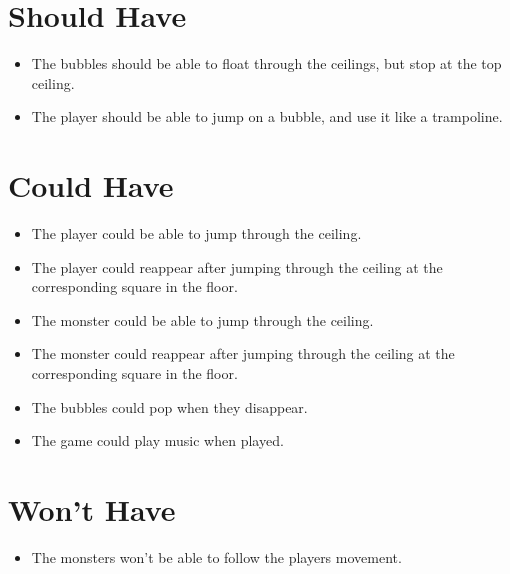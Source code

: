 \section{Should Have}
\begin{itemize}
\itemsep0em
\item The bubbles should be able to float through the ceilings, but stop at the top ceiling.
\item The player should be able to jump on a bubble, and use it like a trampoline.
\end{itemize}

\section{Could Have}
\begin{itemize}
\itemsep0em
\item The player could be able to jump through the ceiling.
\item The player could reappear after jumping through the ceiling at the corresponding square in the floor.
\item The monster could be able to jump through the ceiling.
\item The monster could reappear after jumping through the ceiling at the corresponding square in the floor.
\item The bubbles could pop when they disappear.
\item The game could play music when played.
\end{itemize}

\section{Won't Have}
\begin{itemize}
\itemsep0em
\item The monsters won't be able to follow the players movement.
\end{itemize}